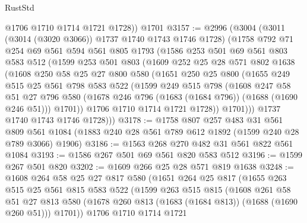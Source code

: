 \begin{lexlean}{RustStd}
\begin{coremodule}
        @1706
        @1710
        @1714
        @1721
        @1728))
    @1701
@3157 := @2996
    (@3004
      (@3011 (@3014 (@3020 @3066)) @1737 @1740 @1743 @1746 @1728)
      (@1758
        @792
        @71
        @254
        @69
        @561
        @594
        @561
        @805
        @1793
        (@1586
          @253
          @501
          @69
          @561
          @803
          @583
          @512
          (@1599
            @253
            @501
            @803
            (@1609
              @252
              @25
              @28
              @571
              @802
              @1638
              (@1608
                @250
                @58
                @25
                @27
                @800
                @580
                (@1651
                  @250
                  @25
                  @800
                  (@1655
                    @249
                    @515
                    @25
                    @561
                    @798
                    @583
                    @522
                    (@1599
                      @249
                      @515
                      @798
                      (@1608
                        @247
                        @58
                        @51
                        @27
                        @796
                        @580
                        (@1678 @246 @796 (@1683 (@1684 @796)) (@1688 (@1690 @246 @51)))
                        @1701))
                    @1706
                    @1710
                    @1714
                    @1721
                    @1728))
                @1701)))
          @1737
          @1740
          @1743
          @1746
          @1728)))
@3178 := @1758
    @807
    @257
    @483
    @31
    @561
    @809
    @561
    @1084
    (@1883 @240 @28 @561 @789 @612 @1892 (@1599 @240 @28 @789 @3066) @1906)
@3186 := @1563 @268 @270 @482 @31 @561 @822 @561 @1084
@3193 := @1586 @267 @501 @69 @561 @820 @583 @512
@3196 := @1599 @267 @501 @820
@3202 := @1609 @266 @25 @28 @571 @819 @1638
@3248 := @1608
    @264
    @58
    @25
    @27
    @817
    @580
    (@1651
      @264
      @25
      @817
      (@1655
        @263
        @515
        @25
        @561
        @815
        @583
        @522
        (@1599
          @263
          @515
          @815
          (@1608
            @261
            @58
            @51
            @27
            @813
            @580
            (@1678 @260 @813 (@1683 (@1684 @813)) (@1688 (@1690 @260 @51)))
            @1701))
        @1706
        @1710
        @1714
        @1721

\end{coremodule}
\end{lexlean}

